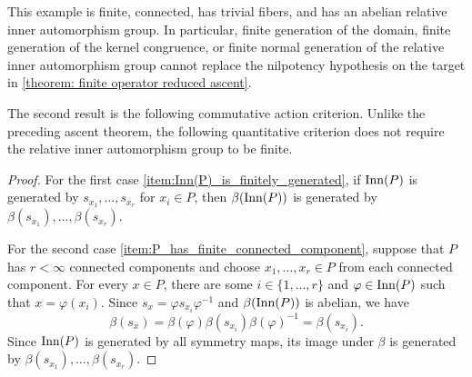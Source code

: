 This example is finite, connected, has trivial fibers, and has an abelian
relative inner automorphism group. In particular, finite generation of
the domain, finite generation of the kernel congruence, or finite
normal generation of the relative inner automorphism group cannot
replace the nilpotency hypothesis on the target in
\cref{theorem: finite operator reduced ascent}. 



The second result is the following commutative action criterion. Unlike the preceding ascent theorem, the following quantitative criterion does not require the relative inner automorphism group to be finite.


\begin{proof}
For the first case \ref{item:Inn(P)_is_finitely_generated}, if $\operatorname{Inn}(P)$ is generated by $s_{x_1},\dots,s_{x_r}$ for $x_i\in P$, then $\beta(\operatorname{Inn}(P))$ is generated by $\beta(s_{x_1}),\ldots,\beta(s_{x_r})$.

For the second case \ref{item:P_has_finite_connected_component}, suppose that $P$ has $r<\infty$ connected components and choose $x_1,\ldots,x_r\in P$ from each connected component.
For every $x\in P$, there are some $i\in \{1,\dots,r\}$ and $\varphi\in\operatorname{Inn}(P)$ such that $x=\varphi(x_i)$. Since $s_x=\varphi s_{x_i}\varphi^{-1}$ and $\beta(\operatorname{Inn}(P))$ is abelian, we have
\[ \beta(s_x) = \beta(\varphi)\beta(s_{x_i})\beta(\varphi)^{-1} = \beta(s_{x_i}). \]
Since $\operatorname{Inn}(P)$ is generated by all symmetry maps, its image under $\beta$ is generated by $\beta(s_{x_1}),\ldots,\beta(s_{x_r})$.
\end{proof}

